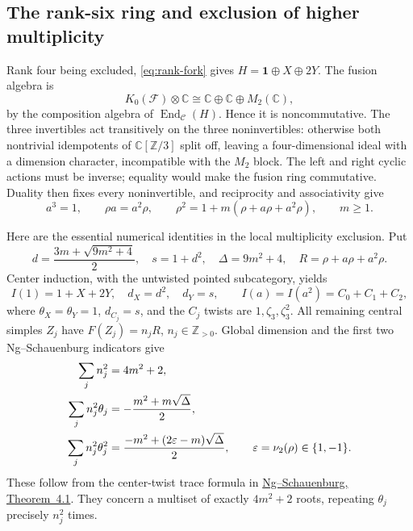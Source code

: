 \subsection{The rank-six ring and exclusion of higher multiplicity}

Rank four being excluded, \eqref{eq:rank-fork} gives
$H=\mathbf1\oplus X\oplus2Y$. The fusion algebra is
\[
 K_0(\mathcal F)\otimes\mathbb C
 \cong\mathbb C\oplus\mathbb C\oplus M_2(\mathbb C),
\]
by the composition algebra of $\operatorname{End}_{\mathcal C}(H)$.
Hence it is noncommutative. The three invertibles act transitively on
the three noninvertibles: otherwise both nontrivial idempotents of
$\mathbb C[\mathbb Z/3]$ split off, leaving a four-dimensional ideal
with a dimension character, incompatible with the $M_2$ block.
The left and right cyclic actions must be inverse; equality would
make the fusion ring commutative. Duality then fixes every noninvertible,
and reciprocity and associativity give
\begin{equation}
 a^3=1,\qquad\rho a=a^2\rho,\qquad
 \rho^2=1+m(\rho+a\rho+a^2\rho),\qquad m\ge1.
 \label{eq:rank6-ring}
\end{equation}

Here are the essential numerical identities in the local multiplicity
exclusion. Put
\[
 d=\frac{3m+\sqrt{9m^2+4}}2,\quad s=1+d^2,\quad
 \Delta=9m^2+4,\quad R=\rho+a\rho+a^2\rho.
\]
Center induction, with the untwisted pointed subcategory, yields
\[
 I(1)=1+X+2Y,\quad d_X=d^2,\quad d_Y=s,
 \qquad I(a)=I(a^2)=C_0+C_1+C_2,
\]
where $\theta_X=\theta_Y=1$, $d_{C_j}=s$, and the $C_j$ twists are
$1,\zeta_3,\zeta_3^2$.
All remaining central simples $Z_j$ have $F(Z_j)=n_jR$,
$n_j\in\mathbb Z_{>0}$. Global dimension and the first two
Ng--Schauenburg indicators give
\begin{align}
 \sum_jn_j^2&=4m^2+2,\notag\\
 \sum_jn_j^2\theta_j&=-\frac{m^2+m\sqrt\Delta}{2},
 \label{eq:indicator-first}\\
 \sum_jn_j^2\theta_j^2
 &=\frac{-m^2+(2\varepsilon-m)\sqrt\Delta}{2},
 \qquad\varepsilon=\nu_2(\rho)\in\{1,-1\}.
 \label{eq:indicator-second}
\end{align}
These follow from the center-twist trace formula in
\href{https://arxiv.org/pdf/math/0601012}{Ng--Schauenburg,
Theorem~4.1}. They concern a multiset of exactly $4m^2+2$ roots,
repeating $\theta_j$ precisely $n_j^2$ times.

